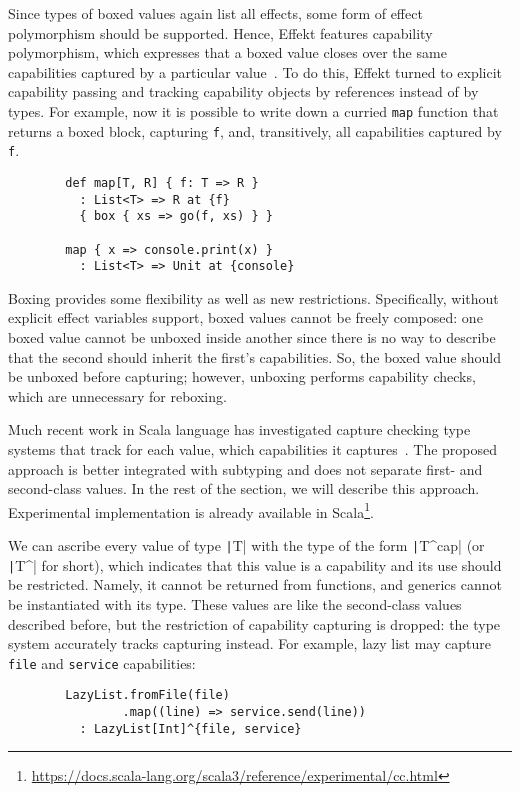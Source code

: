 \documentclass[conference]{IEEEtran}
\begin{document}
    Since types of boxed values again list all effects, some form of effect polymorphism should be supported.
    Hence, Effekt features capability polymorphism, which expresses that a boxed value closes over the same capabilities captured by a particular value~\cite{brachthauser2022effects}.
    To do this, Effekt turned to explicit capability passing and tracking capability objects by references instead of by types.
    For example, now it is possible to write down a curried \texttt{map} function that returns a boxed block, capturing \texttt{f}, and, transitively, all capabilities captured by \texttt{f}.
    \begin{verbatim}
        def map[T, R] { f: T => R }
          : List<T> => R at {f}
          { box { xs => go(f, xs) } }

        map { x => console.print(x) }
          : List<T> => Unit at {console}
    \end{verbatim}

    Boxing provides some flexibility as well as new restrictions.
    Specifically, without explicit effect variables support, boxed values cannot be freely composed: one boxed value cannot be unboxed inside another since there is no way to describe that the second should inherit the first's capabilities.
    So, the boxed value should be unboxed before capturing; however, unboxing performs capability checks, which are unnecessary for reboxing.

    Much recent work in Scala language has investigated capture checking type systems that track for each value, which capabilities it captures~\cite{odersky2022scoped, boruch2023capturing}.
    The proposed approach is better integrated with subtyping and does not separate first- and second-class values.
    In the rest of the section, we will describe this approach.
    Experimental implementation is already available in Scala\footnote{\url{https://docs.scala-lang.org/scala3/reference/experimental/cc.html}}.

    We can ascribe every value of type \texttt|T| with the type of the form \texttt|T^{cap}| (or \texttt|T^| for short), which indicates that this value is a capability and its use should be restricted.
    Namely, it cannot be returned from functions, and generics cannot be instantiated with its type.
    These values are like the second-class values described before, but the restriction of capability capturing is dropped: the type system accurately tracks capturing instead.
    For example, lazy list may capture \texttt{file} and \texttt{service} capabilities:
    \begin{verbatim}
        LazyList.fromFile(file)
                .map((line) => service.send(line))
          : LazyList[Int]^{file, service}
    \end{verbatim}
\end{document}
